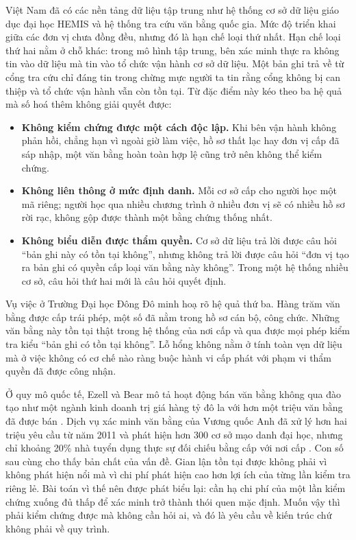 Việt Nam đã có các nền tảng dữ liệu tập trung như hệ thống cơ sở dữ liệu giáo dục đại học HEMIS và hệ thống tra cứu văn bằng quốc gia. Mức độ triển khai giữa các đơn vị chưa đồng đều, nhưng đó là hạn chế loại thứ nhất. Hạn chế loại thứ hai nằm ở chỗ khác: trong mô hình tập trung, bên xác minh thực ra không tin vào dữ liệu mà tin vào tổ chức vận hành cơ sở dữ liệu. Một bản ghi trả về từ cổng tra cứu chỉ đáng tin trong chừng mực người ta tin rằng cổng không bị can thiệp và tổ chức vận hành vẫn còn tồn tại. Từ đặc điểm này kéo theo ba hệ quả mà số hoá thêm không giải quyết được:

\begin{itemize}
    \item \textbf{Không kiểm chứng được một cách độc lập.} Khi bên vận hành không phản hồi, chẳng hạn vì ngoài giờ làm việc, hồ sơ thất lạc hay đơn vị cấp đã sáp nhập, một văn bằng hoàn toàn hợp lệ cũng trở nên không thể kiểm chứng.
    \item \textbf{Không liên thông ở mức định danh.} Mỗi cơ sở cấp cho người học một mã riêng; người học qua nhiều chương trình ở nhiều đơn vị sẽ có nhiều hồ sơ rời rạc, không gộp được thành một bằng chứng thống nhất.
    \item \textbf{Không biểu diễn được thẩm quyền.} Cơ sở dữ liệu trả lời được câu hỏi ``bản ghi này có tồn tại không'', nhưng không trả lời được câu hỏi ``đơn vị tạo ra bản ghi có quyền cấp loại văn bằng này không''. Trong một hệ thống nhiều cơ sở, câu hỏi thứ hai mới là câu hỏi quyết định.
\end{itemize}

Vụ việc ở Trường Đại học Đông Đô minh hoạ rõ hệ quả thứ ba. Hàng trăm văn bằng được cấp trái phép, một số đã nằm trong hồ sơ cán bộ, công chức. Những văn bằng này tồn tại thật trong hệ thống của nơi cấp và qua được mọi phép kiểm tra kiểu ``bản ghi có tồn tại không''. Lỗ hổng không nằm ở tính toàn vẹn dữ liệu mà ở việc không có cơ chế nào ràng buộc hành vi cấp phát với phạm vi thẩm quyền đã được công nhận.

Ở quy mô quốc tế, Ezell và Bear mô tả hoạt động bán văn bằng không qua đào tạo như một ngành kinh doanh trị giá hàng tỷ đô la với hơn một triệu văn bằng đã được bán \cite{EzellBear2012}. Dịch vụ xác minh văn bằng của Vương quốc Anh đã xử lý hơn hai triệu yêu cầu từ năm 2011 và phát hiện hơn 300 cơ sở mạo danh đại học, nhưng chỉ khoảng 20\% nhà tuyển dụng thực sự đối chiếu bằng cấp với nơi cấp \cite{Prospects_Hedd2026}. Con số sau cùng cho thấy bản chất của vấn đề. Gian lận tồn tại được không phải vì không phát hiện nổi mà vì chi phí phát hiện cao hơn lợi ích của từng lần kiểm tra riêng lẻ. Bài toán vì thế nên được phát biểu lại: cần hạ chi phí của một lần kiểm chứng xuống đủ thấp để xác minh trở thành thói quen mặc định. Muốn vậy thì phải kiểm chứng được mà không cần hỏi ai, và đó là yêu cầu về kiến trúc chứ không phải về quy trình.

